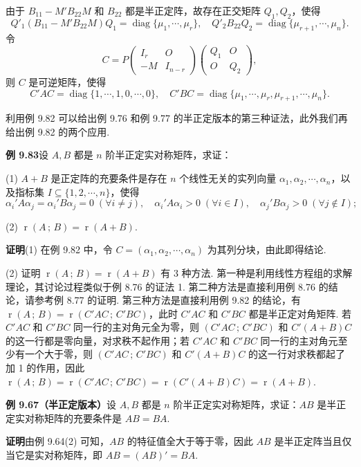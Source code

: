 \documentclass[UTF8,12pt,a4paper,fontset=fandol]{ctexart}
\begin{document}
由于 $B_{11}-M'B_{22}M$ 和 $B_{22}$ 都是半正定阵，故存在正交矩阵 $Q_1,Q_2$，使得
\[
Q'_1(B_{11}-M'B_{22}M)Q_1=\operatorname{diag}\{\mu_1,\cdots,\mu_r\},\quad
Q'_2B_{22}Q_2=\operatorname{diag}\{\mu_{r+1},\cdots,\mu_n\}.
\]
令
\[
C=P\begin{pmatrix}
I_r&O\\
-M&I_{n-r}
\end{pmatrix}
\begin{pmatrix}
Q_1&O\\
O&Q_2
\end{pmatrix},
\]
则 $C$ 是可逆矩阵，使得
\[
C'AC=\operatorname{diag}\{1,\cdots,1,0,\cdots,0\},\quad
C'BC=\operatorname{diag}\{\mu_1,\cdots,\mu_r,\mu_{r+1},\cdots,\mu_n\}.
\]

利用例 9.82 可以给出例 9.76 和例 9.77 的半正定版本的第三种证法，此外我们再给出例 9.82 的两个应用.

\noindent\textbf{例 9.83}\quad 设 $A,B$ 都是 $n$ 阶半正定实对称矩阵，求证：

(1) $A+B$ 是正定阵的充要条件是存在 $n$ 个线性无关的实列向量 $\alpha_1,\alpha_2,\cdots,\alpha_n$，以及指标集 $I\subseteq\{1,2,\cdots,n\}$，使得
\[
\alpha_i'A\alpha_j=\alpha_i'B\alpha_j=0\;(\forall i\ne j),\quad
\alpha_i'A\alpha_i>0\;(\forall i\in I),\quad
\alpha_j'B\alpha_j>0\;(\forall j\notin I);
\]

(2) $\operatorname{r}(A\,;\,B)=\operatorname{r}(A+B)$.

\noindent\textbf{证明}\quad (1) 在例 9.82 中，令 $C=(\alpha_1,\alpha_2,\cdots,\alpha_n)$ 为其列分块，由此即得结论.

(2) 证明 $\operatorname{r}(A\,;\,B)=\operatorname{r}(A+B)$ 有 3 种方法. 第一种是利用线性方程组的求解理论，其讨论过程类似于例 8.76 的证法 1. 第二种方法是直接利用例 8.76 的结论，请参考例 8.77 的证明. 第三种方法是直接利用例 9.82 的结论，有 $\operatorname{r}(A\,;\,B)=\operatorname{r}(C'AC\,;\,C'BC)$，此时 $C'AC$ 和 $C'BC$ 都是半正定对角矩阵. 若 $C'AC$ 和 $C'BC$ 同一行的主对角元全为零，则 $(C'AC\,;\,C'BC)$ 和 $C'(A+B)C$ 的这一行都是零向量，对求秩不起作用；若 $C'AC$ 和 $C'BC$ 同一行的主对角元至少有一个大于零，则 $(C'AC\,;\,C'BC)$ 和 $C'(A+B)C$ 的这一行对求秩都起了加 1 的作用，因此 $\operatorname{r}(A\,;\,B)=\operatorname{r}(C'AC\,;\,C'BC)=\operatorname{r}(C'(A+B)C)=\operatorname{r}(A+B)$.

\noindent\textbf{例 9.67（半正定版本）}\quad 设 $A,B$ 都是 $n$ 阶半正定实对称矩阵，求证：$AB$ 是半正定实对称矩阵的充要条件是 $AB=BA$.

\noindent\textbf{证明}\quad 由例 9.64(2) 可知，$AB$ 的特征值全大于等于零，因此 $AB$ 是半正定阵当且仅当它是实对称矩阵，即 $AB=(AB)'=BA$.
\end{document}
